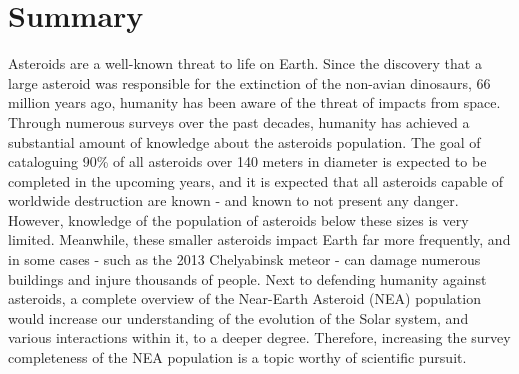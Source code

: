 \chapter{Summary}

Asteroids are a well-known threat to life on Earth. Since the discovery that a large asteroid was responsible for the extinction of the non-avian dinosaurs, 66 million years ago, humanity has been aware of the threat of impacts from space. Through numerous surveys over the past decades, humanity has achieved a substantial amount of knowledge about the asteroids population. The goal of cataloguing 90\% of all asteroids over 140 meters in diameter is expected to be completed in the upcoming years, and it is expected that all asteroids capable of worldwide destruction are known - and known to not present any danger. However, knowledge of the population of asteroids below these sizes is very limited. Meanwhile, these smaller asteroids impact Earth far more frequently, and in some cases - such as the 2013 Chelyabinsk meteor - can damage numerous buildings and injure thousands of people. Next to defending humanity against asteroids, a complete overview of the Near-Earth Asteroid (NEA) population would increase our understanding of the evolution of the Solar system, and various interactions within it, to a deeper degree. Therefore, increasing the survey completeness of the NEA population is a topic worthy of scientific pursuit. \\

